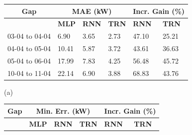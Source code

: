 \begin{table}[H]
	\centering
	\begin{subfigure}{\textwidth}
		\centering
		\begin{tabular}{l|l|l|l|l|l}
			\multicolumn{1}{c|}{\textbf{Gap}} & \multicolumn{3}{c|}{\textbf{MAE (kW)}}
			                                  & \multicolumn{2}{c}{\textbf{Incr. Gain (\%)}}                                                             \\
			\hline
			                                  & \textbf{MLP}                                 & \textbf{RNN} & \textbf{TRN} & \textbf{RNN} & \textbf{TRN} \\
			\cline{2-6}
			03-04 to 04-04                    & 6.90                                         & 3.65         & 2.73         & 47.10        & 25.21        \\
			04-04 to 05-04                    & 10.41                                        & 5.87         & 3.72         & 43.61        & 36.63        \\
			05-04 to 06-04                    & 17.99                                        & 7.83         & 4.25         & 56.48        & 45.72        \\
			10-04 to 11-04                    & 22.14                                        & 6.90         & 3.88         & 68.83        & 43.76
		\end{tabular}
		\caption*{(a)}
	\end{subfigure}
	\begin{subfigure}{\textwidth}
		\centering
		\begin{tabular}{l|l|l|l|l|l}
			\multicolumn{1}{c|}{\textbf{Gap}} & \multicolumn{3}{c|}{\textbf{Min. Err. (kW)}}
			                                  & \multicolumn{2}{c}{\textbf{Incr. Gain (\%)}}                                                             \\
			\hline
			                                  & \textbf{MLP}                                 & \textbf{RNN} & \textbf{TRN} & \textbf{RNN} & \textbf{TRN} \\

\end{tabular}
\end{subfigure}
\end{table}
